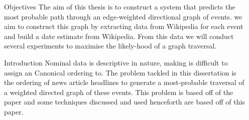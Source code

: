 \documentclass[final]{beamer}
\newlength{\sepwid}
\newlength{\onecolwid}
\begin{document}
\begin{frame}[t] %

\begin{columns}[t] %

\begin{column}{\sepwid}\end{column} %

\begin{column}{\onecolwid} %


  \begin{alertblock}{Objectives}
    The aim of this thesis is to construct a system that predicts the most probable path
    through an edge-weighted directional graph of events.
    we aim to construct this graph by extracting data from Wikipedia for each event and
    build a date estimate from Wikipedia. From this data we will conduct several experiments
    to maximise the likely-hood of a graph traversal.
  
\end{alertblock}


\begin{block}{Introduction}
Nominal data is descriptive in nature, making is difficult to assign an Canonical ordering to.
The problem tackled in this dissertation is the ordering of news article headlines to generate
a most-probable traversal of a weighted directed graph of these events.
This problem is based off of the paper \cite{abend2015lexical} and some
techniques discussed and used henceforth are based off of this paper.



\end{block}
\end{column}
\end{columns}
\end{frame}
\end{document}
